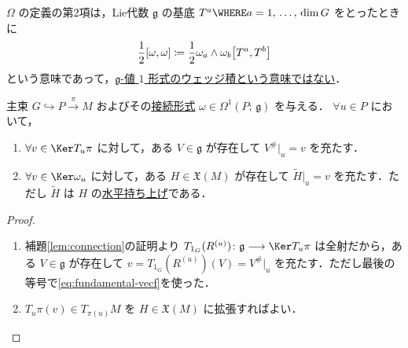 \documentclass[geometry_main]{subfiles}
\begin{document}
\begin{marker}
    $\Omega$ の定義の第2項は，Lie代数 $\mathfrak{g}$ の基底 $T^a \WHERE a = 1,\, \dots,\, \dim G$ をとったときに
    \begin{align}
        \frac{1}{2} \comm{\omega}{\omega} \coloneqq \frac{1}{2} \omega_a \wedge \omega_b \comm{T^a}{T^b}
    \end{align}
    という意味であって，\underline{$\mathfrak{g}$-値 $1$ 形式のウェッジ積という意味ではない}．
\end{marker}

\begin{mylem}[label=lem:extend-horizontal]{}
    主束 $G \hookrightarrow P \xrightarrow{\pi} M$ およびその\hyperref[def:connection]{接続形式} $\omega \in \Omega^1(P;\, \mathfrak{g})$ を与える．
    $\forall u \in P$ において，
    \begin{enumerate}
        \item $\forall v \in \Ker T_u \pi$ に対して，ある $V \in \mathfrak{g}$ が存在して $V^\#|_u = v$ を充たす．
        \item $\forall v \in \Ker \omega_u$ に対して，ある $H \in \mathfrak{X}(M)$ が存在して $\tilde{H}|_u = v$ を充たす．ただし $\tilde{H}$ は $H$ の\hyperref[def:horizontal-lift-vecf]{水平持ち上げ}である．
    \end{enumerate}
    
\end{mylem}

\begin{proof}
    \begin{enumerate}
        \item 補題\ref{lem:connection}の証明より $T_{1_G} (R^{(u)}) \colon \mathfrak{g} \lto \Ker T_u \pi$ は全射だから，ある $V \in \mathfrak{g}$ が存在して $v = T_{1_G} (R^{(u)}) (V) = V^\#|_u$ を充たす．ただし最後の等号で\eqref{eq:fundamental-vecf}を使った．
        \item $T_u \pi (v) \in T_{\pi(u)} M$ を $H \in \mathfrak{X}(M)$ に拡張すればよい．
    \end{enumerate}
\end{proof}
\end{document}
